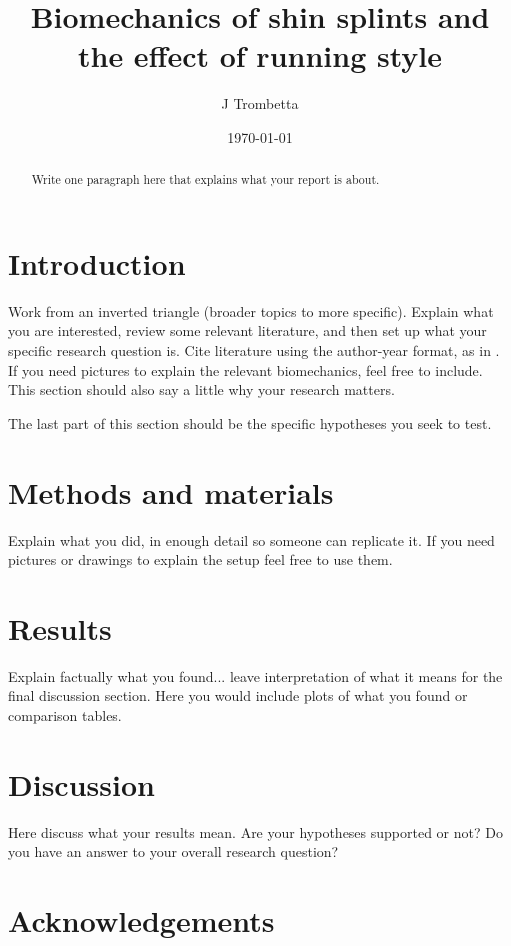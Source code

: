 \documentclass{article}
\title{Biomechanics of shin splints and the effect of running style}
\author{J Trombetta}
\date{\today}
\begin{document}
\maketitle
\begin{abstract}
Write one paragraph here that explains what your report is about.
\end{abstract}

\section{Introduction}
Work from an inverted triangle (broader topics to more specific). Explain what you are interested, review some relevant literature, and then set up what your specific research question is. Cite literature using the author-year format, as in \citep{buck2020go}. If you need pictures to explain the relevant biomechanics, feel free to include. This section should also say a little why your research matters. 

The last part of this section should be the specific hypotheses you seek to test. 

\section{Methods and materials}
Explain what you did, in enough detail so someone can replicate it. If you need pictures or drawings to explain the setup feel free to use them. 

\section{Results}
Explain factually what you found... leave interpretation of what it means for the final discussion section. Here you would include plots of what you found or comparison tables.

\section{Discussion}
Here discuss what your results mean. Are your hypotheses supported or not? Do you have an answer to your overall research question?

\section{Acknowledgements}


\end{document}

